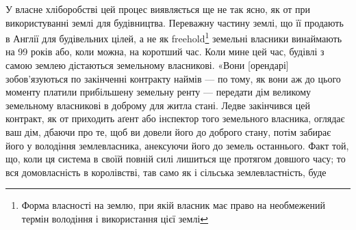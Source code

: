 У власне хліборобстві цей процес виявляється ще не так ясно, як
от при використуванні землі для будівництва. Переважну частину землі, що її
продають в Англії для будівельних цілей, а не як freehold\footnote*{
Форма власності на землю, при якій власник має право на необмежений термін володіння і використання цієї землі 
} земельні власники
винаймають на 99 років або, коли можна, на коротший час. Коли мине цей
час, будівлі з самою землею дістаються земельному власникові. «Вони [орендарі]
зобов’язуються по закінченні контракту наймів — по тому, як вони аж до цього
моменту платили прибільшену земельну ренту — передати дім великому земельному
власникові в доброму для житла стані. Ледве закінчився цей контракт,
як от приходить аґент або інспектор того земельного власника, оглядає ваш
дім, дбаючи про те, щоб ви довели його до доброго стану, потім забирає його
у володіння землевласника, анексуючи його до земель останнього. Факт той, що,
коли ця система в своїй повній силі лишиться ще протягом довшого часу; то
вся домовласність в королівстві, тав само як і сільська землевластність, буде
\parbreak{}  %
